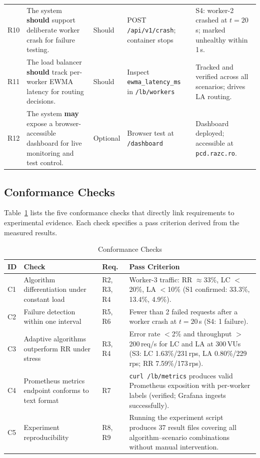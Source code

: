 \documentclass[conference]{IEEEtran}
\begin{document}
\begin{table}[t]
\begin{tabular}{@{}p{0.5cm}p{4.9cm}p{1.6cm}p{3.2cm}p{3.1cm}@{}}
R10 & The system \textbf{should} support deliberate worker crash for failure testing.
    & Should & POST \texttt{/api/v1/crash}; container stops
    & S4: worker-2 crashed at $t=20$\,s; marked unhealthy within 1\,s. \\
R11 & The load balancer \textbf{should} track per-worker EWMA latency for routing decisions.
    & Should & Inspect \texttt{ewma\_latency\_ms} in \texttt{/lb/workers}
    & Tracked and verified across all scenarios; drives LA routing. \\
R12 & The system \textbf{may} expose a browser-accessible dashboard for live monitoring and test control.
    & Optional & Browser test at \texttt{/dashboard}
    & Dashboard deployed; accessible at \texttt{pcd.razc.ro}. \\
\bottomrule
\end{tabular}
\end{table}

\subsection{Conformance Checks}

Table~\ref{tab:conformance} lists the five conformance checks that
directly link requirements to experimental evidence. Each check
specifies a pass criterion derived from the measured results.

\begin{table}[h]
\caption{Conformance Checks}
\label{tab:conformance}
\centering
\small
\renewcommand{\arraystretch}{1.2}
\begin{tabular}{@{}p{0.5cm}p{3.0cm}p{1.2cm}p{2.3cm}@{}}
\toprule
\textbf{ID} & \textbf{Check} & \textbf{Req.} & \textbf{Pass Criterion} \\
\midrule
C1 & Algorithm differentiation under constant load
   & R2, R3, R4
   & Worker-3 traffic: RR $\approx$33\%, LC $<$20\%, LA $<$10\% (S1 confirmed: 33.3\%, 13.4\%, 4.9\%). \\
C2 & Failure detection within one interval
   & R5, R6
   & Fewer than 2 failed requests after a worker crash at $t=20$\,s (S4: 1 failure). \\
C3 & Adaptive algorithms outperform RR under stress
   & R3, R4
   & Error rate $<$2\% and throughput $>$200\,req/s for LC and LA at 300\,VUs (S3: LC 1.63\%/231\,rps, LA 0.80\%/229\,rps; RR 7.59\%/173\,rps). \\
C4 & Prometheus metrics endpoint conforms to text format
   & R7
   & \texttt{curl /lb/metrics} produces valid Prometheus exposition with per-worker labels (verified; Grafana ingests successfully). \\
C5 & Experiment reproducibility
   & R8, R9
   & Running the experiment script produces 37 result files covering all algorithm--scenario combinations without manual intervention. \\
\bottomrule
\end{tabular}
\end{table}
\end{document}
